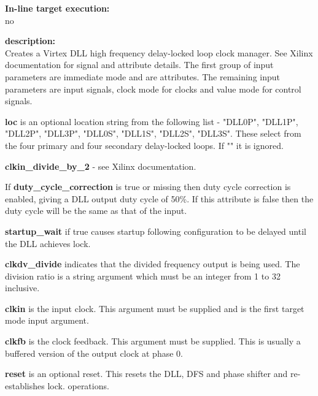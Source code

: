             {\bf In-line target execution:} \\
            no

            {\bf description:} \\
            Creates a Virtex DLL high frequency delay-locked loop clock manager. See
            Xilinx documentation for signal and attribute details. The first group
            of input parameters are immediate mode and are attributes. The remaining
            input parameters are input signals, clock mode for clocks and value mode
            for control signals.


                {\bf loc} is an optional location string from the
                following list - "DLL0P", "DLL1P", "DLL2P", "DLL3P", "DLL0S", "DLL1S",
                "DLL2S", "DLL3S". These select from the four primary and four secondary
                delay-locked loops. If "" it is ignored.

                {\bf clkin\_divide\_by\_2} - see Xilinx documentation.

                If {\bf duty\_cycle\_correction} is true or missing then duty cycle
                correction is enabled, giving a DLL output duty cycle of 50\%. If
                this attribute is false then the duty cycle will be the same as that
                of the input.

                {\bf startup\_wait} if true causes startup following configuration to
                be delayed until the DLL achieves lock.

                {\bf clkdv\_divide} indicates that the divided
                frequency output is being used. The division ratio is a
                string argument which must be an integer from 1 to 32 inclusive.


                {\bf clkin} is the input clock. This argument must be
                supplied and is the first target mode input argument.

                {\bf clkfb} is the clock feedback. This argument must be
                supplied. This is usually a buffered version of the output clock at
                phase 0.

                {\bf reset} is an optional reset. This resets the
                DLL, DFS and phase shifter and re-establishes lock.
                operations.

